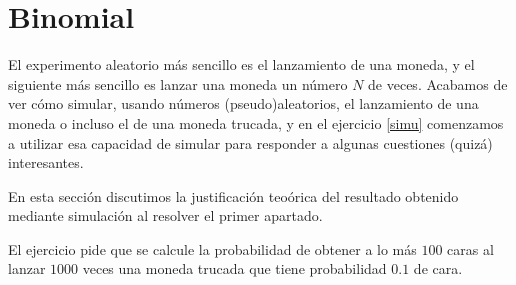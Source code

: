  \section{Binomial}
El experimento aleatorio m\'as sencillo es el lanzamiento de una moneda, y el
siguiente m\'as sencillo es lanzar una moneda un n\'umero $N$ de veces. Acabamos
de ver c\'omo simular, usando n\'umeros (pseudo)aleatorios,  el lanzamiento de
una moneda o incluso el de una moneda trucada, y en el ejercicio \ref{simu}
comenzamos a utilizar esa capacidad de simular para responder a algunas
cuestiones (quiz\'a) interesantes. 

En esta secci\'on discutimos la justificaci\'on teo\'orica del resultado
obtenido mediante simulaci\'on al resolver el primer apartado. 

El ejercicio pide que se calcule la probabilidad de obtener a lo m\'as $100$
caras al lanzar $1000$ veces una moneda trucada que tiene probabilidad $0{.}1$
de cara. 
